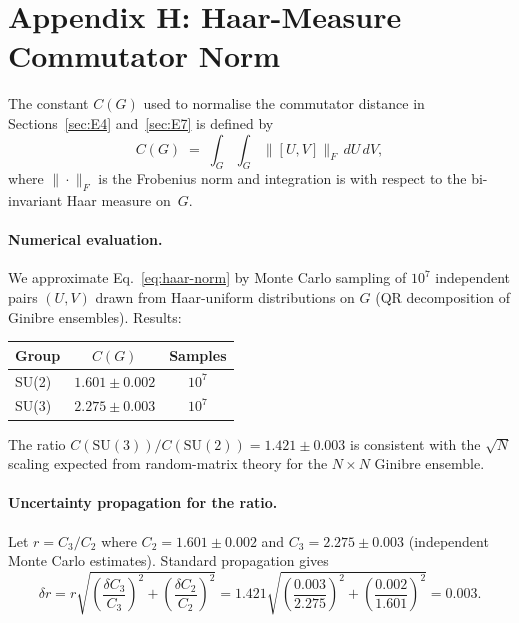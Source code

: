 
\section*{Appendix H: Haar-Measure Commutator Norm}
\label{app:haar_norm}


The constant $C(G)$ used to normalise the commutator distance in
Sections~\ref{sec:E4} and~\ref{sec:E7} is defined by
\begin{equation}
  C(G) \;=\; \int_{G}\!\int_{G}
    \bigl\| [U,V] \bigr\|_F \, dU \, dV ,
  \label{eq:haar-norm}
\end{equation}
where $\|\cdot\|_F$ is the Frobenius norm and integration is with respect
to the bi-invariant Haar measure on~$G$.

\paragraph{Numerical evaluation.}
We approximate Eq.~\eqref{eq:haar-norm} by Monte Carlo sampling of $10^7$
independent pairs $(U,V)$ drawn from Haar-uniform distributions on $G$
(QR decomposition of Ginibre ensembles).  Results:

\begin{center}
\begin{tabular}{lcc}
\hline
Group & $C(G)$ & Samples \\
\hline
SU(2) & $1.601 \pm 0.002$ & $10^7$ \\
SU(3) & $2.275 \pm 0.003$ & $10^7$ \\
\hline
\end{tabular}
\end{center}

The ratio $C(\mathrm{SU}(3))/C(\mathrm{SU}(2)) = 1.421 \pm 0.003$ is
consistent with the $\sqrt{N}$ scaling expected from random-matrix theory for
the $N\times N$ Ginibre ensemble.

\paragraph{Uncertainty propagation for the ratio.}
Let $r = C_3/C_2$ where $C_2 = 1.601\pm0.002$ and $C_3 = 2.275\pm0.003$
(independent Monte Carlo estimates).  Standard propagation gives
\begin{equation}
  \delta r = r\sqrt{\!\left(\frac{\delta C_3}{C_3}\right)^{\!2}
                   +\left(\frac{\delta C_2}{C_2}\right)^{\!2}}
  = 1.421\sqrt{\!\left(\frac{0.003}{2.275}\right)^{\!2}
               +\left(\frac{0.002}{1.601}\right)^{\!2}}
  = 0.003.
  \label{eq:haar-ratio-err}
\end{equation}

